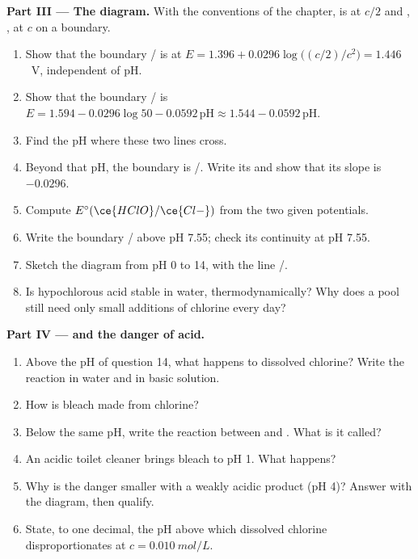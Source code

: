 \begin{problem}
\medskip
\noindent\textbf{Part III --- The diagram.}
With the conventions of the chapter,  is at $c/2$ and
, ,  at $c$ on a boundary.
\begin{enumerate}[resume]
  \item Show that the boundary / is at $E = 1.396 +
        0.0296\log\bigl((c/2)/c^2\bigr) = 1.446$~V, independent of pH.
  \item Show that the boundary / is $E = 1.594 -
        0.0296\log 50 - 0.0592\,\mathrm{pH} \approx 1.544 -
        0.0592\,\mathrm{pH}$.
  \item Find the pH where these two lines cross.
  \item Beyond that pH, the boundary is /. Write its
         and show that its slope is $-0.0296$.
  \item Compute $E^\circ(\ce{HClO}/\ce{Cl-})$ from the two given potentials.
  \item Write the boundary / above pH 7.55; check its
        continuity at pH 7.55.
  \item Sketch the diagram from pH 0 to 14, with the line /.
  \item Is hypochlorous acid stable in water, thermodynamically? Why does
        a pool still need only small additions of chlorine every day?
\end{enumerate}

\medskip
\noindent\textbf{Part IV ---  and the danger of acid.}
\begin{enumerate}[resume]
  \item Above the pH of question 14, what happens to dissolved chlorine?
        Write the reaction in water and in basic solution.
  \item How is bleach made from chlorine?
  \item Below the same pH, write the reaction between  and
        . What is it called?
  \item An acidic toilet cleaner brings bleach to pH 1. What happens?
  \item Why is the danger smaller with a weakly acidic product
        (pH 4)? Answer with the diagram, then qualify.
  \item State, to one decimal, the pH above which dissolved chlorine
        disproportionates at $c = \qty{0.010}{mol/L}$.
\end{enumerate}
\end{problem}
